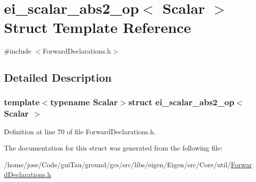 \hypertarget{structei__scalar__abs2__op}{\section{ei\-\_\-scalar\-\_\-abs2\-\_\-op$<$ Scalar $>$ Struct Template Reference}
\label{structei__scalar__abs2__op}
}


{\ttfamily \#include $<$Forward\-Declarations.\-h$>$}



\subsection{Detailed Description}
\subsubsection*{template$<$typename Scalar$>$struct ei\-\_\-scalar\-\_\-abs2\-\_\-op$<$ Scalar $>$}



Definition at line 70 of file Forward\-Declarations.\-h.



The documentation for this struct was generated from the following file\-:\begin{DoxyCompactItemize}
\item 
/home/jose/\-Code/gui\-Tau/ground/gcs/src/libs/eigen/\-Eigen/src/\-Core/util/\hyperlink{_forward_declarations_8h}{Forward\-Declarations.\-h}\end{DoxyCompactItemize}
